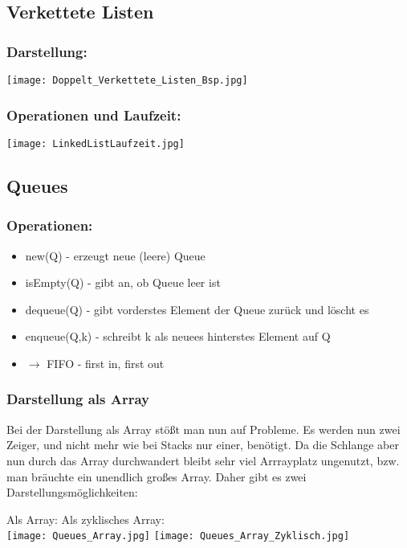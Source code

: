 	\subsection{Verkettete Listen}
		\begin{minipage}[t]{0.5\textwidth}
			\subsubsection{Darstellung:}
				\begin{center}
					\texttt{[image: Doppelt\_Verkettete\_Listen\_Bsp.jpg]}
				\end{center}
		\end{minipage}
		\begin{minipage}[t]{0.45\textwidth}
			\begin{center}
				\subsubsection{Operationen und Laufzeit:}
				\texttt{[image: LinkedListLaufzeit.jpg]}
			\end{center}
		\end{minipage}

		\vspace{1.5cm}

	

	\subsection{Queues}
		\subsubsection{Operationen:}
			\begin{itemize}
				\item new(Q) - erzeugt neue (leere) Queue
				\item isEmpty(Q) - gibt an, ob Queue leer ist
				\item dequeue(Q) - gibt vorderstes Element der Queue zurück und löscht es
				\item enqueue(Q,k) - schreibt k als neuees hinterstes Element auf Q
				\item $\longrightarrow$ FIFO - first in, first out
			\end{itemize}

		\subsubsection{Darstellung als Array}
			Bei der Darstellung als Array stö\ss t man nun auf Probleme. Es werden nun zwei Zeiger, 
			und nicht mehr wie bei Stacks nur einer, benötigt. Da die Schlange aber nun durch das 
			Array durchwandert bleibt sehr viel Arrrayplatz ungenutzt, bzw. man bräuchte ein unendlich
			gro\ss es Array. Daher gibt es zwei Darstellungsmöglichkeiten:
			\begin{center}
				Als Array: \hspace{5cm} Als zyklisches Array:\\
				\texttt{[image: Queues\_Array.jpg]}
				\texttt{[image: Queues\_Array\_Zyklisch.jpg]}
			\end{center}

